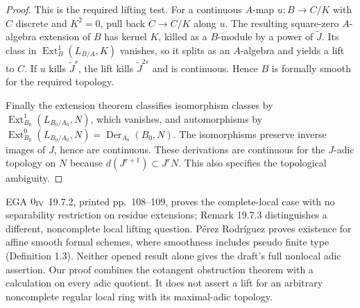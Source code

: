 \begin{proof}
This is the required lifting test. For a continuous $A$-map
$u:B\to C/K$ with $C$ discrete and $K^2=0$, pull back
$C\to C/K$ along $u$. The resulting square-zero $A$-algebra
extension of $B$ has kernel $K$, killed as a $B$-module by a power
of $\widetilde J$. Its class in
$\operatorname{Ext}^1_B(L_{B/A},K)$ vanishes, so it splits as an
$A$-algebra and yields a lift to $C$. If $u$ kills
$\widetilde J^s$, the lift kills $\widetilde J^{2s}$ and is
continuous. Hence $B$ is formally smooth for the required topology.

Finally the extension theorem classifies isomorphism classes by
$\operatorname{Ext}^1_{B_0}(L_{B_0/A_0},N)$, which vanishes,
and automorphisms by
$\operatorname{Ext}^0_{B_0}(L_{B_0/A_0},N)
=\operatorname{Der}_{A_0}(B_0,N)$.
The isomorphisms preserve inverse images of $J$, hence are
continuous. These derivations are continuous for the $J$-adic
topology on $N$ because $d(J^{r+1})\subset J^rN$.
This also specifies the topological ambiguity.
\end{proof}

\begin{remark}
\label{SA23-A-17}
EGA $0_{\rm IV}$ 19.7.2, printed pp.~108--109, proves the
complete-local case with no separability restriction on residue
extensions; Remark 19.7.3 distinguishes a different, noncomplete
local lifting question. P\'erez Rodr\'iguez
\cite[Corollary 4.3]{rootPerez2008} proves existence for affine
smooth formal schemes, where smoothness includes pseudo finite
type (Definition 1.3). Neither opened result alone gives the
draft's full nonlocal adic assertion. Our proof combines the
cotangent obstruction theorem with a calculation on every adic
quotient. It does not assert a lift for an arbitrary noncomplete
regular local ring with its maximal-adic topology.
\end{remark}

